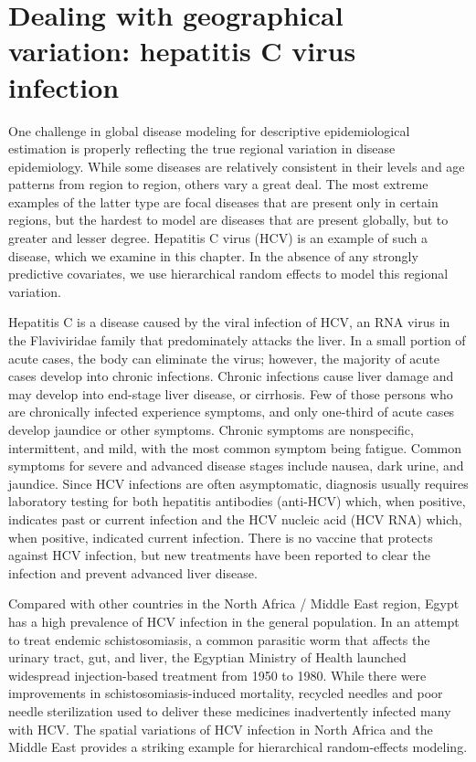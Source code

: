 \chapter{Dealing with geographical variation: hepatitis C virus infection}
\label{applications-rfx}

One challenge in global disease modeling for descriptive
epidemiological estimation is properly reflecting the true regional
variation in disease epidemiology. While some diseases are relatively
consistent in their levels and age patterns from region to region,
others vary a great deal.  The most extreme examples of the latter type are focal
diseases that are present only in certain regions, but the hardest to
model are diseases that are present globally, but to greater and lesser
degree.  Hepatitis C virus (HCV) is an example of such a disease,
which we examine in this chapter.  In the absence of any strongly
predictive covariates, we use hierarchical random effects to model
this regional variation.

Hepatitis C is a disease caused by the viral infection of HCV, an RNA
virus in the Flaviviridae family that
predominately attacks the liver.  In a small
portion of acute cases, the body can eliminate the virus; however, the
majority of acute cases develop into chronic infections.  Chronic
infections cause liver damage and may develop into end-stage liver
disease, or cirrhosis.  Few of those persons who are chronically infected experience symptoms,
and only one-third of acute cases develop jaundice or other symptoms.
Chronic symptoms are nonspecific, intermittent, and mild, with the most
common symptom being fatigue.  Common symptoms for severe and advanced
disease stages include nausea, dark urine, and jaundice.  Since
HCV infections are often asymptomatic, diagnosis usually requires laboratory
testing for both hepatitis antibodies (anti-HCV) which, when positive, indicates past or current infection and the HCV nucleic acid
(HCV RNA) which, when positive, indicated current infection.
There is no vaccine that protects against HCV infection, but
new treatments have been reported to clear the infection and
prevent advanced liver disease.\cite{hoofnagle_hepatitis_1997, ghany_diagnosis_2009, ghany_update_2011}

Compared with other countries in the North Africa / Middle East region,
Egypt has a high prevalence of HCV infection in the general population.  In an attempt to treat
endemic schistosomiasis, a common parasitic worm that affects the
urinary tract, gut, and liver, the Egyptian Ministry of Health launched
widespread injection-based treatment from 1950 to 1980.  While
there were improvements in schistosomiasis-induced mortality, recycled
needles and poor needle sterilization used to deliver these medicines inadvertently infected many with HCV.
\cite{frank_role_2000, mezban_hepatitis_2006, strickland_liver_2006}
The spatial variations of HCV infection in
North Africa and the Middle East provides a striking example for
hierarchical random-effects modeling.

